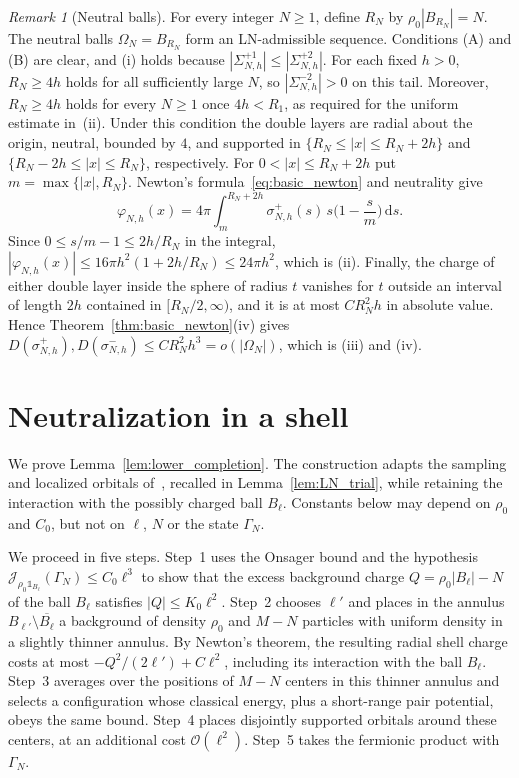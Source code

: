 \documentclass[final,reqno]{amsart}
\theoremstyle{remark}
\newtheorem{remark}{Remark}
\theoremstyle{definition}
\renewcommand{\le}{\leqslant}
\renewcommand{\ge}{\geqslant}
\newcommand{\iden}{\mathbb{1}}
\begin{document}
\medskip

\begin{remark}[Neutral balls]\label{rem:LN_balls}
For every integer $N\ge1$, define $R_N$ by $\rho_0|B_{R_N}|=N$. The neutral balls $\Omega_N=B_{R_N}$ form an LN-admissible sequence. Conditions (A) and (B) are clear, and (i) holds because $|\Sigma^{+1}_{N,h}|\le|\Sigma^{+2}_{N,h}|$. For each fixed $h>0$, $R_N\ge4h$ holds for all sufficiently large $N$, so $|\Sigma^{-2}_{N,h}|>0$ on this tail. Moreover, $R_N\ge4h$ holds for every $N\ge1$ once $4h<R_1$, as required for the uniform estimate in~(ii). Under this condition the double layers are radial about the origin, neutral, bounded by $4$, and supported in $\{R_N\le|x|\le R_N+2h\}$ and $\{R_N-2h\le|x|\le R_N\}$, respectively. For $0<|x|\le R_N+2h$ put $m=\max\{|x|,R_N\}$. Newton's formula~\eqref{eq:basic_newton} and neutrality give
\[
\varphi_{N,h}(x)=4\pi\int_m^{R_N+2h}\sigma^+_{N,h}(s)\,s\Big(1-\frac sm\Big)\,\mathrm ds.
\]
Since $0\le s/m-1\le2h/R_N$ in the integral, $|\varphi_{N,h}(x)|\le16\pi h^2(1+2h/R_N)\le24\pi h^2$, which is (ii). Finally, the charge of either double layer inside the sphere of radius $t$ vanishes for $t$ outside an interval of length $2h$ contained in $[R_N/2,\infty)$, and it is at most $CR_N^2h$ in absolute value. Hence Theorem~\ref{thm:basic_newton}(iv) gives $D(\sigma^+_{N,h}),D(\sigma^-_{N,h})\le CR_N^2h^3=o(|\Omega_N|)$, which is (iii) and (iv).
\end{remark}

\section{Neutralization in a shell}\label{sec:canonical_completion}

We prove Lemma~\ref{lem:lower_completion}. The construction adapts the sampling and localized orbitals of~\cite[Sec.~5.1]{lieb1975thermodynamic}, recalled in Lemma~\ref{lem:LN_trial}, while retaining the interaction with the possibly charged ball $B_\ell$. Constants below may depend on $\rho_0$ and $C_0$, but not on $\ell$, $N$ or the state $\Gamma_N$.

We proceed in five steps.
Step~1 uses the Onsager bound and the hypothesis $\mathcal J_{\rho_0\iden_{B_\ell}}(\Gamma_N)\le C_0\ell^3$ to show that the excess background charge $Q=\rho_0|B_\ell|-N$ of the ball $B_\ell$ satisfies $|Q|\le K_0\ell^2$. Step~2 chooses $\ell'$ and places in the annulus $B_{\ell'}\setminus\overline{B_\ell}$ a background of density $\rho_0$ and $M-N$ particles with uniform density in a slightly thinner annulus. By Newton's theorem, the resulting radial shell charge costs at most $-Q^2/(2\ell')+C\ell^2$, including its interaction with the ball $B_\ell$. Step~3 averages over the positions of $M-N$ centers in this thinner annulus and selects a configuration whose classical energy, plus a short-range pair potential, obeys the same bound. Step~4 places disjointly supported orbitals around these centers, at an additional cost $\mathcal O(\ell^2)$. Step~5 takes the fermionic product with $\Gamma_N$.
\end{document}
